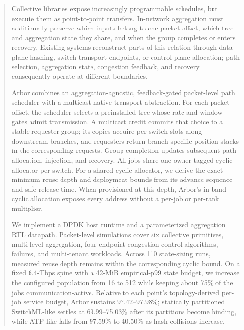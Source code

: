 \begin{abstract}

Collective libraries expose increasingly programmable schedules, but execute
them as point-to-point transfers. In-network aggregation must additionally
preserve which inputs belong to one packet offset, which tree and aggregation
state they share, and when the group completes or enters recovery. Existing
systems reconstruct parts of this relation through data-plane hashing, switch
transport endpoints, or control-plane allocation; path selection, aggregation
state, congestion feedback, and recovery consequently operate at different
boundaries.

Arbor combines an aggregation-agnostic, feedback-gated packet-level path
scheduler with a multicast-native transport abstraction. For each packet offset,
the scheduler selects a preinstalled tree whose rate and window gates admit
transmission. A multicast credit commits that choice to a stable requester group;
its copies acquire per-switch slots along downstream branches, and requesters
return branch-specific position stacks in the corresponding requests. Group
completion updates subsequent path allocation, injection, and recovery. All jobs
share one owner-tagged cyclic allocator per switch. For a shared cyclic
allocator, we derive the exact minimum
reuse depth and deployment bounds from its advance sequence and safe-release
time. When provisioned at this depth, Arbor's in-band cyclic allocation exposes
every address without a per-job or per-rank multiplier.

We implement a DPDK host runtime and a parameterized aggregation RTL datapath.
Packet-level simulations cover six collective primitives, multi-level aggregation, four endpoint
congestion-control algorithms, failures, and multi-tenant workloads. Across 110
state-sizing runs, measured reuse depth remains within the corresponding cyclic
bound. On a fixed 6.4-Tbps spine with a 42-MiB empirical-p99 state budget, we
increase the configured population from 16 to 512 while keeping about 75\%
of the jobs communication-active. Relative to each point's topology-derived
per-job service budget, Arbor sustains 97.42--97.98\%; statically partitioned
SwitchML-like settles at 69.99--75.03\% after its partitions become binding,
while ATP-like falls from 97.59\% to 40.50\% as hash collisions increase.


\end{abstract}

